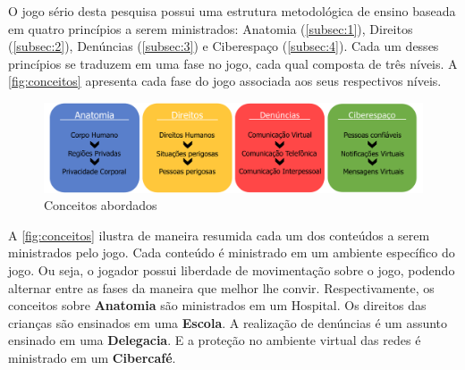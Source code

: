 
O jogo sério desta pesquisa possui uma estrutura metodológica de ensino baseada em quatro princípios a serem ministrados: Anatomia (\autoref{subsec:1}), Direitos (\autoref{subsec:2}), Denúncias (\autoref{subsec:3}) e Ciberespaço (\autoref{subsec:4}). Cada um desses princípios se traduzem em uma fase no jogo, cada qual composta de três níveis. A \autoref{fig:conceitos} apresenta cada fase do jogo associada aos seus respectivos níveis.


\begin{figure}[hbt!]
  \caption{\label{fig:conceitos}Conceitos abordados}\vspace{-0.2cm}
  \begin{center}
    \includegraphics[width=\linewidth]{./Figuras/EsquemaFases.pdf}
    \end{center}\vspace{-0.5cm}
  
\end{figure}

\vspace{-0.2cm}

A \autoref{fig:conceitos} ilustra de maneira resumida cada um dos conteúdos a serem ministrados pelo jogo. Cada conteúdo é ministrado em um ambiente específico do jogo. Ou seja, o jogador possui liberdade de movimentação sobre o jogo, podendo alternar entre as fases da maneira que melhor lhe convir. Respectivamente, os conceitos sobre \textbf{Anatomia} são ministrados em um Hospital. Os direitos das crianças são ensinados em uma \textbf{Escola}. A realização de denúncias é um assunto ensinado em uma \textbf{Delegacia}. E a proteção no ambiente virtual das redes é ministrado em um \textbf{Cibercafé}.

